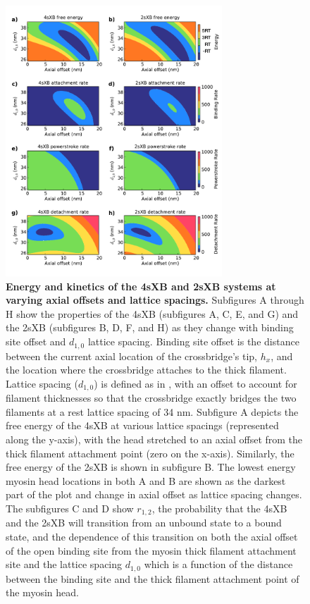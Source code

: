 \documentclass[]{article}
\begin{document}
\begin{figure}[htbp]
    \begin{center}
    \includegraphics[width=3.2in]{../imgs/Figure2.pdf}
    \caption{
        \label{fig_kinetics_contours}
        \textbf{Energy and kinetics of the 4sXB and 2sXB systems at varying axial offsets and lattice spacings.} 
        Subfigures A through H show the properties of the 4sXB (subfigures A, C, E, and G) and the 2sXB (subfigures B, D, F, and H) as they change with binding site offset and $d_{1,0}$ lattice spacing.
        Binding site offset is the distance between the current axial location of the crossbridge's tip, $h_x$, and the location where the crossbridge attaches to the thick filament.
        Lattice spacing ($d_{1,0}$) is defined as in \citet{Millman1998}, with an offset to account for filament thicknesses so that the crossbridge exactly bridges the two filaments at a rest lattice spacing of 34 nm.
        Subfigure A depicts the free energy of the 4sXB at various lattice spacings (represented along the y-axis), with the head stretched to an axial offset from the thick filament attachment point (zero on the x-axis).
        Similarly, the free energy of the 2sXB is shown in subfigure B.
        The lowest energy myosin head locations in both A and B are shown as the darkest part of the plot and change in axial offset as lattice spacing changes.
        The subfigures C and D show $r_{1,2}$, the probability that the 4sXB and the 2sXB will transition from an unbound state to a bound state, and the dependence of this transition on both the axial offset of the open binding site from the myosin thick filament attachment site and the lattice spacing $d_{1,0}$ which is a function of the distance between the binding site and the thick filament attachment point of the myosin head. 
}
\end{center}
\end{figure}
\end{document}
